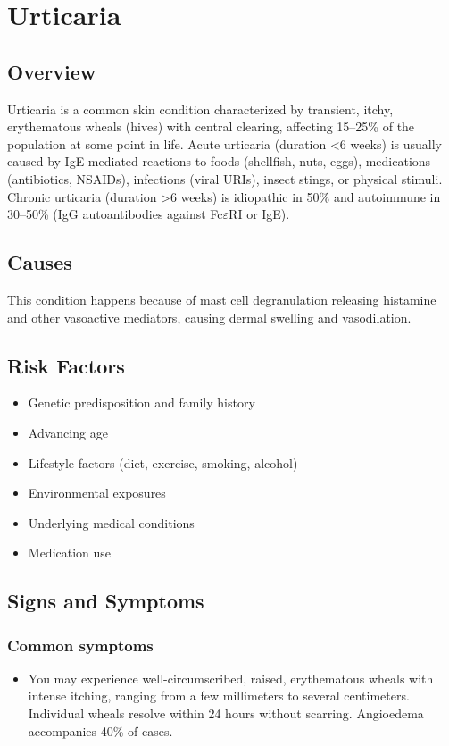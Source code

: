 \chapter{Urticaria}
\label{sec:Urticaria}

\section{Overview}
Urticaria is a common skin condition characterized by transient, itchy, erythematous wheals (hives) with central clearing, affecting 15--25\% of the population at some point in life. Acute urticaria (duration <6 weeks) is usually caused by IgE-mediated reactions to foods (shellfish, nuts, eggs), medications (antibiotics, NSAIDs), infections (viral URIs), insect stings, or physical stimuli. Chronic urticaria (duration >6 weeks) is idiopathic in 50\% and autoimmune in 30--50\% (IgG autoantibodies against Fc$\varepsilon$RI or IgE).
\section{Causes}
This condition happens because of mast cell degranulation releasing histamine and other vasoactive mediators, causing dermal swelling and vasodilation.     
\section{Risk Factors}

\begin{itemize}[noitemsep]
  \item Genetic predisposition and family history
  \item Advancing age
  \item Lifestyle factors (diet, exercise, smoking, alcohol)
  \item Environmental exposures
  \item Underlying medical conditions
  \item Medication use
\end{itemize}
\section{Signs and Symptoms}

\subsection{Common symptoms}
\begin{itemize}[noitemsep]
  \item You may experience well-circumscribed, raised, erythematous wheals with intense itching, ranging from a few millimeters to several centimeters. Individual wheals resolve within 24 hours without scarring. Angioedema accompanies 40\% of cases. 
  \end{itemize}

